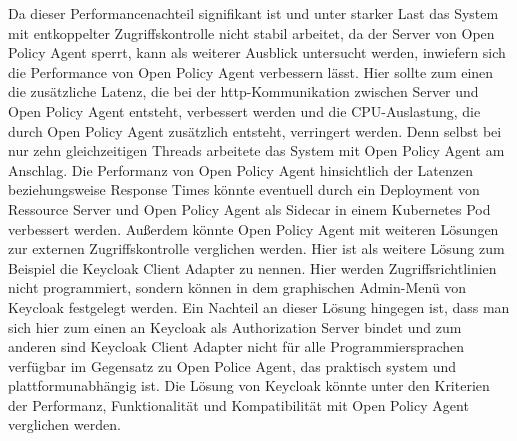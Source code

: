 Da dieser Performancenachteil signifikant ist und unter starker Last das System mit entkoppelter Zugriffskontrolle nicht stabil arbeitet, da der Server von Open Policy Agent sperrt, kann als weiterer Ausblick untersucht werden, inwiefern sich die Performance von Open Policy Agent verbessern lässt. Hier sollte zum einen die zusätzliche Latenz, die bei der http-Kommunikation zwischen Server und Open Policy Agent entsteht, verbessert werden und die CPU-Auslastung, die durch Open Policy Agent zusätzlich entsteht, verringert werden. Denn selbst bei nur zehn gleichzeitigen Threads arbeitete das System mit Open Policy Agent am Anschlag. Die Performanz von Open Policy Agent hinsichtlich der Latenzen beziehungsweise Response Times könnte eventuell durch ein Deployment von Ressource Server und Open Policy Agent als Sidecar in einem Kubernetes Pod verbessert werden. Außerdem könnte Open Policy Agent mit weiteren Lösungen zur externen Zugriffskontrolle verglichen werden. Hier ist als weitere Lösung zum Beispiel die Keycloak Client Adapter zu nennen. Hier werden Zugriffsrichtlinien nicht programmiert, sondern können in dem graphischen Admin-Menü von Keycloak festgelegt werden. Ein Nachteil an dieser Lösung hingegen ist, dass man sich hier zum einen an Keycloak als Authorization Server bindet und zum anderen sind Keycloak Client Adapter nicht für alle Programmiersprachen verfügbar im Gegensatz zu Open Police Agent, das praktisch system und plattformunabhängig ist. Die Lösung von Keycloak könnte unter den Kriterien der Performanz, Funktionalität und Kompatibilität mit Open Policy Agent verglichen werden. 

